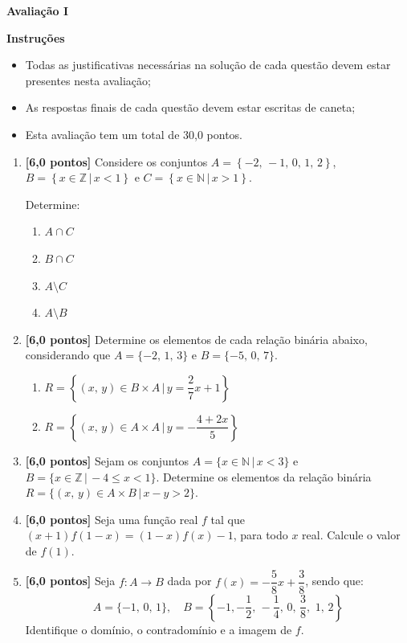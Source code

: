\documentclass[12pt,a4paper]{article}
\begin{document}
\begin{center}
 \textbf{Avaliação I}
\end{center}

\textbf{Instruções}
\begin{itemize}
 \item Todas as justificativas necessárias na solução de cada questão devem estar presentes nesta avaliação;
 \item As respostas finais de cada questão devem estar escritas de caneta;
 \item Esta avaliação tem um total de 30,0 pontos.
\end{itemize}

\begin{enumerate}
  \item \textbf{[6,0 pontos]} Considere os conjuntos $A = \left\{-2,\,-1,\,0,\,1,\,2\right\}$,
    $B = \left\{x\in\mathbb{Z} \,|\, x < 1\right\}$ e
    $C = \left\{x\in\mathbb{N} \,|\, x > 1\right\}$.

    Determine:
    \begin{enumerate}
      \item $A\cap C$
      \item $B\cap C$
      \item $A\setminus C$
      \item $A\setminus B$
    \end{enumerate}
 
  \item \textbf{[6,0 pontos]} Determine os elementos de cada relação binária abaixo,
    considerando que $A = \{-2,\,1,\,3\}$ e $B = \{-5,\, 0,\, 7\}$.
    \begin{enumerate}
      \item $R = \left\{(x,\,y) \in B\times A \,|\, y = \dfrac{2}{7}x + 1\right\}$
      \item $R = \left\{(x,\,y) \in A\times A \,|\, y = -\dfrac{4 + 2x}{5}\right\}$
    \end{enumerate}

  \item \textbf{[6,0 pontos]} Sejam os conjuntos $A = \{x\in\mathbb{N}\,|\, x < 3\}$ e 
    $B = \{x\in\mathbb{Z}\,|\, -4\leq x < 1\}$. Determine os elementos da relação
    binária $R = \{(x,\,y) \in A\times B \,|\, x - y > 2\}$.

  \item \textbf{[6,0 pontos]} Seja uma função real $f$ tal que $(x + 1)f(1 - x) = (1 - x)f(x) - 1$, para 
  todo $x$ real. Calcule o valor de $f(1)$.

  \item \textbf{[6,0 pontos]} Seja $f:A\to B$ dada por $f(x) = -\dfrac{5}{8}x + \dfrac{3}{8}$, sendo que:
    $$A = \{-1,\,0,\,1\},\quad B = \left\{-1,-\frac{1}{2},\,-\frac{1}{4},\,0,\,\frac{3}{8},\,\,1,\,2\right\}$$
    Identifique o domínio, o contradomínio e a imagem de $f$.

\end{enumerate}
\end{document}
